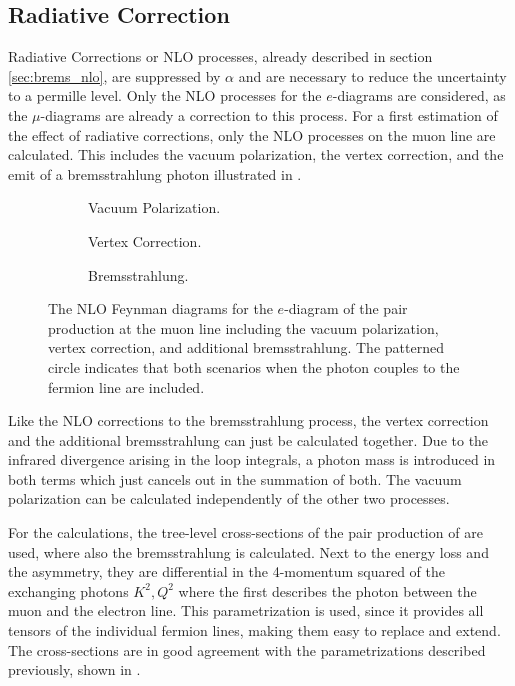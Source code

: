 \subsection{Radiative Correction}

Radiative Corrections or NLO processes, already described in section \ref{sec:brems_nlo}, are suppressed by $\alpha$ and are necessary to reduce the uncertainty to a permille level.
Only the NLO processes for the $e$-diagrams are considered, as the $\mu$-diagrams are already a correction to this process.
For a first estimation of the effect of radiative corrections, only the NLO processes on the muon line are calculated.
This includes the vacuum polarization, the vertex correction, and the emit of a bremsstrahlung photon illustrated in .
\begin{figure}
    \begin{subfigure}[t]{0.3\textwidth}
        \centering
        
        \caption{Vacuum Polarization.}
        \label{fig:feyn_epair_vac}
    \end{subfigure}
    \hfill
    \begin{subfigure}[t]{0.3\textwidth}
        \centering
        
        \caption{Vertex Correction.}
        \label{fig:feyn_epair_vertex}
    \end{subfigure}
    \hfill
    \begin{subfigure}[t]{0.3\textwidth}
        \centering
        
        \caption{Bremsstrahlung.}
        \label{fig:feyn_epair_brems}
    \end{subfigure}
    \caption{The NLO Feynman diagrams for the $e$-diagram of the pair production at the muon line including the vacuum polarization, vertex correction, and additional bremsstrahlung. The patterned circle indicates that both scenarios when the photon couples to the fermion line are included.}
    \label{fig:feyn_epair_nlo}
\end{figure}

Like the NLO corrections to the bremsstrahlung process, the vertex correction and the additional bremsstrahlung can just be calculated together.
Due to the infrared divergence arising in the loop integrals, a photon mass is introduced in both terms which just cancels out in the summation of both.
The vacuum polarization can be calculated independently of the other two processes.

For the calculations, the tree-level cross-sections of the pair production of \cite{Bugaev77} are used, where also the bremsstrahlung is calculated.
Next to the energy loss and the asymmetry, they are differential in the 4-momentum squared of the exchanging photons $K^2, Q^2$ where the first describes the photon between the muon and the electron line.
This parametrization is used, since it provides all tensors of the individual fermion lines, making them easy to replace and extend.
The cross-sections are in good agreement with the parametrizations described previously, shown in .

